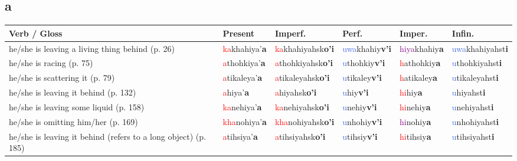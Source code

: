 \documentclass[oneside,openany]{book}%
\begin{document}
\subsection*{a}%
\begin{tabularx}{\textwidth}{>{\hsize=1.5\hsize\RaggedRight}X >{\hsize=0.9\hsize}X >{\hsize=0.9\hsize}X >{\hsize=0.9\hsize}X >{\hsize=0.9\hsize}X >{\hsize=0.9\hsize}X}%
\toprule%
\textbf{Verb / Gloss}&\textbf{Present}&\textbf{Imperf.}&\textbf{Perf.}&\textbf{Imper.}&\textbf{Infin.}\\%
\midrule%
he/she is leaving a living thing behind (p. 26)&\textcolor{Red}{ka}khahiya'\textbf{a}&\textcolor{Red}{ka}khahiyahsk\textbf{o'i}&\textcolor{RoyalBlue}{uwa}khahiy\textbf{v'i}&\textcolor{Purple}{hiya}khahiy\textbf{a}&\textcolor{RoyalBlue}{uwa}khahiyahst\textbf{i}\\%
he/she is racing (p. 75)&\textcolor{Red}{a}thohkiya'\textbf{a}&\textcolor{Red}{a}thohkiyahsk\textbf{o'i}&\textcolor{RoyalBlue}{u}thohkiy\textbf{v'i}&\textcolor{Red}{h}athohkiy\textbf{a}&\textcolor{RoyalBlue}{u}thohkiyahst\textbf{i}\\%
he/she is scattering it (p. 79)&\textcolor{Red}{a}tikaleya'\textbf{a}&\textcolor{Red}{a}tikaleyahsk\textbf{o'i}&\textcolor{RoyalBlue}{u}tikaley\textbf{v'i}&\textcolor{Red}{h}atikaley\textbf{a}&\textcolor{RoyalBlue}{u}tikaleyahst\textbf{i}\\%
he/she is leaving it behind (p. 132)&\textcolor{Red}{a}hiya'\textbf{a}&\textcolor{Red}{a}hiyahsk\textbf{o'i}&\textcolor{RoyalBlue}{u}hiy\textbf{v'i}&\textcolor{Red}{hi}hiy\textbf{a}&\textcolor{RoyalBlue}{u}hiyahst\textbf{i}\\%
he/she is leaving some liquid (p. 158)&\textcolor{Red}{ka}nehiya'\textbf{a}&\textcolor{Red}{ka}nehiyahsk\textbf{o'i}&\textcolor{RoyalBlue}{u}nehiy\textbf{v'i}&\textcolor{Red}{hi}nehiy\textbf{a}&\textcolor{RoyalBlue}{u}nehiyahst\textbf{i}\\%
he/she is omitting him/her (p. 169)&\textcolor{Red}{kha}nohiya'\textbf{a}&\textcolor{Red}{kha}nohiyahsk\textbf{o'i}&\textcolor{RoyalBlue}{u}nhohiy\textbf{v'i}&\textcolor{Purple}{hi}nohiy\textbf{a}&\textcolor{RoyalBlue}{u}nhohiyahst\textbf{i}\\%
he/she is leaving it behind (refers to a long object) (p. 185)&\textcolor{Red}{a}tihsiya'\textbf{a}&\textcolor{Red}{a}tihsiyahsk\textbf{o'i}&\textcolor{RoyalBlue}{u}tihsiy\textbf{v'i}&\textcolor{Red}{hi}tihsiy\textbf{a}&\textcolor{RoyalBlue}{u}tihsiyahst\textbf{i}\\%
\bottomrule%
\end{tabularx}%
\vspace{1em}%
\needspace{3in}%
\end{document}
